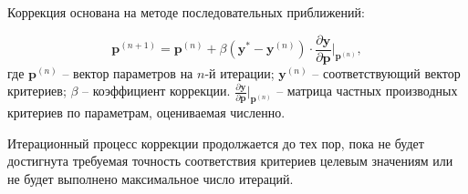 Коррекция основана на методе последовательных приближений:

\begin{equation}\label{eq:parameters_correction}
	\mathbf{p}^{(n+1)} = \mathbf{p}^{(n)} + \beta (\mathbf{y}^* - \mathbf{y}^{(n)}) \cdot \frac{\partial \mathbf{y}}{\partial \mathbf{p}}|_{\mathbf{p}^{(n)}},
\end{equation}
где $\mathbf{p}^{(n)}$ -- вектор параметров на $n$-й итерации;
$\mathbf{y}^{(n)}$ -- соответствующий вектор критериев;
$\beta$ -- коэффициент коррекции.
$\frac{\partial \mathbf{y}}{\partial \mathbf{p}}|_{\mathbf{p}^{(n)}}$ -- матрица частных производных критериев по параметрам, оцениваемая численно.

Итерационный процесс коррекции продолжается до тех пор, пока не будет достигнута
требуемая точность соответствия критериев целевым значениям или не будет выполнено максимальное число итераций.
